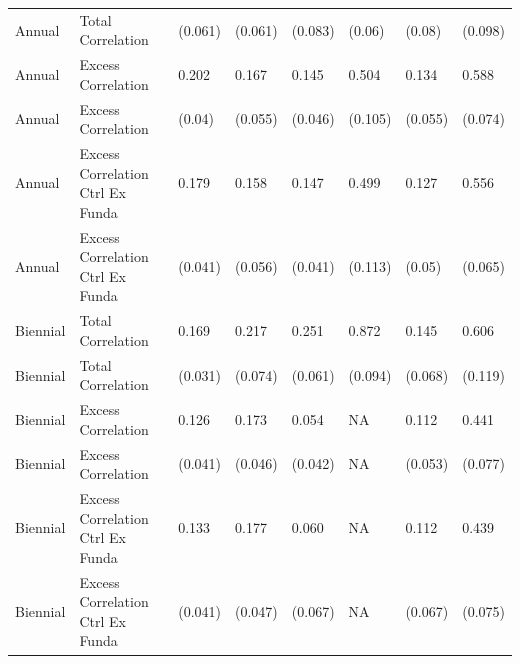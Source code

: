 \begin{tabular}{l|l|l|l|l|l|l|l}
Annual & Total Correlation & (0.061) & (0.061) & (0.083) & (0.06) & (0.08) & (0.098)\\
Annual & Excess Correlation & 0.202 & 0.167 & 0.145 & 0.504 & 0.134 & 0.588\\
Annual & Excess Correlation & (0.04) & (0.055) & (0.046) & (0.105) & (0.055) & (0.074)\\
Annual & Excess Correlation Ctrl Ex Funda & 0.179 & 0.158 & 0.147 & 0.499 & 0.127 & 0.556\\
Annual & Excess Correlation Ctrl Ex Funda & (0.041) & (0.056) & (0.041) & (0.113) & (0.05) & (0.065)\\
Biennial & Total Correlation & 0.169 & 0.217 & 0.251 & 0.872 & 0.145 & 0.606\\
Biennial & Total Correlation & (0.031) & (0.074) & (0.061) & (0.094) & (0.068) & (0.119)\\
Biennial & Excess Correlation & 0.126 & 0.173 & 0.054 & NA & 0.112 & 0.441\\
Biennial & Excess Correlation & (0.041) & (0.046) & (0.042) & NA & (0.053) & (0.077)\\
Biennial & Excess Correlation Ctrl Ex Funda & 0.133 & 0.177 & 0.060 & NA & 0.112 & 0.439\\
Biennial & Excess Correlation Ctrl Ex Funda & (0.041) & (0.047) & (0.067) & NA & (0.067) & (0.075)\\
\hline
\end{tabular}
